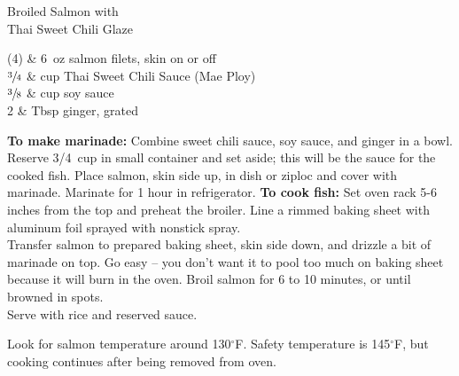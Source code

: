 \setHeadlines
{
}

\begin{recipe}
[ %
    source = CTB prepped meal,
]
{Broiled Salmon with \\Thai Sweet Chili Glaze}
    
    \ingredients
    {
		(4) & 6~oz salmon filets, skin on or off \\
		$\sfrac{3}{4}$ & cup Thai Sweet Chili Sauce (Mae Ploy) \\
		$\sfrac{3}{8}$ & cup soy sauce \\
		2 & Tbsp ginger, grated \\
    }
    
    \preparation
    {
        \step \textbf{To make marinade:} Combine sweet chili sauce, soy sauce, and ginger in a bowl. Reserve 3/4~cup in small container and set aside; this will be the sauce for the cooked fish.
		\step Place salmon, skin side up, in dish or ziploc and cover with marinade. Marinate for 1 hour in refrigerator.
		\step \textbf{To cook fish:} Set oven rack 5-6 inches from the top and preheat the broiler. 
		\step Line a rimmed baking sheet with aluminum foil sprayed with nonstick spray. \\
		\step Transfer salmon to prepared baking sheet, skin side down, and drizzle a bit of marinade on top. Go easy -- you don't want it to pool too much on baking sheet because it will burn in the oven. 
		\step Broil salmon for 6 to 10 minutes, or until browned in spots. \\
		\step Serve with rice and reserved sauce. 
    }
	
	\hint
	{
		Look for salmon temperature around 130$^{\circ}$F. Safety temperature is 145$^{\circ}$F, but cooking continues after being removed from oven. 
	}

\end{recipe}
